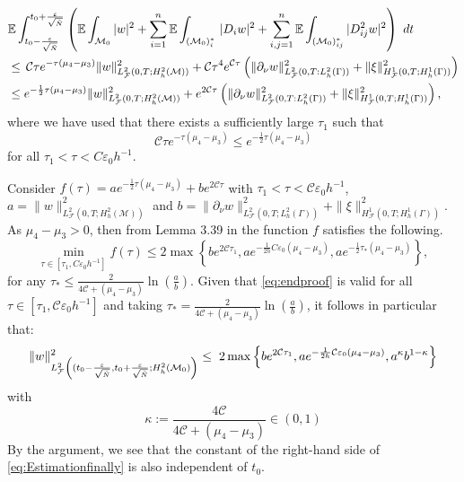 \documentclass[11pt,oneside,leqno]{amsart}
\numberwithin{equation}{section}
\numberwithin{equation}{section}
\newcommand{\E}{\mathbb{E}}
\begin{document}
\begin{equation}\label{eq:endproof}
\begin{split}
     &\E\int_{t_0-\frac{\varepsilon}{\sqrt{\Tilde{N}}}}^{t_0+\frac{\varepsilon}{\sqrt{\Tilde{N}}}}\left(\E\int_{\mathcal{M}_0}|w|^{2}+\sum_{i=1}^{n}\E\int_{(\mathcal{M}_{0})_{i}^{\ast}}\,|D_{i}w|^{2}+\sum_{i,j=1}^{n}\E\int_{(\mathcal{M}_0)^{\ast}_{ij}}|D^2_{ij} w|^2\right)\,\,dt\\
     &\leq\, \mathcal{C}\tau e^{-\tau (\mu_4-\mu_3)}\|w\|^2_{L_{\mathcal{F}}^2(0,T;H_h^2(\mathcal{M}))}+\mathcal{C}\tau^4 e^{\mathcal{C}\tau}\left(\|{ \partial_{\nu}w}\|^2_{L^2_\mathcal{F}(0,T:L_h^2(\Gamma))}+\|\xi\|^2_{H^1_{\mathcal{F}}(0,T;H_h^1(\Gamma))}\right)\\
     &\leq  e^{-\frac{1}{2}\tau (\mu_4-\mu_3)}\|w\|^2_{L_{\mathcal{F}}^2(0,T;H_h^2(\mathcal{M}))}+ e^{2\mathcal{C}\tau}\left(\|{ \partial_{\nu}w}\|^2_{L^2_\mathcal{F}(0,T:L_h^2(\Gamma))}+\|\xi\|^2_{H^1_{\mathcal{F}}(0,T;H_h^1(\Gamma))}\right),
\end{split}
\end{equation}
where we have used that there exists a sufficiently large $\tau_1$ such that
\begin{equation*}
    \mathcal{C}\tau e^{-\tau(\mu_4-\mu_3)}\leq e^{-\frac{1}{2}\tau(\mu_4-\mu_3)}
\end{equation*}
for all $\tau_1<\tau <C\varepsilon_0h^{-1}$. 

Consider $f(\tau)=ae^{-\frac{1}{2}\tau(\mu_4-\mu_3)}+be^{2\mathcal{C}\tau}$ with $\tau_1 <\tau<\mathcal{C}\varepsilon_0h^{-1}$, $a=\|w\|^2_{L^2_{\mathcal{F}}{(0,T;H_h^2(\mathcal{M}))}}$ and $b=\|{ \partial_{\nu}w}\|^2_{L^2_{\mathcal{F}}(0,T;L_h^2(\Gamma))}+\|\xi\|^2_{H^1_{\mathcal{F}}(0,T;H_h^1(\Gamma))}.$ As $\mu_4-\mu_3>0$, then from Lemma 3.39 in \cite{LOPD:2023} the function $f$ satisfies the following.
\[
\min_{\tau\in [\tau_1,C\varepsilon_0h^{-1}]}f(\tau)\leq 2\max\left\{be^{2\mathcal{C}\tau_1},ae^{-\frac{1}{2h}C\varepsilon_0(\mu_4-\mu_3)},ae^{-\frac{1}{2}\tau_{\ast}(\mu_4-\mu_3)}\right\},
\]
for any $\displaystyle \tau_{\ast}\leq \frac{2}{4\mathcal{C}+(\mu_4-\mu_3)}\ln{\left(\frac{a}{b}\right)} $. Given that \eqref{eq:endproof} is valid for all $\tau \in [\tau_1,\mathcal{C}\varepsilon_0h^{-1}]$ and taking $\tau_\ast=\frac{2}{4\mathcal{C}+(\mu_4-\mu_3)}\ln{\left(\frac{a}{b}\right)}$, it follows in particular that: 
\begin{equation}\label{eq:Estimationfinally}
\begin{split}
    \|w\|^2_{L^2_{\mathcal{F}}\left((t_0-\frac{\varepsilon}{\sqrt{\Tilde{N}}},t_0+\frac{\varepsilon}{\sqrt{\Tilde{N}}};H_h^2(\mathcal{M}_0)\right)}\leq\; 2\max\left\{be^{2\mathcal{C}\tau_1},ae^{-\frac{1}{2h}\mathcal{C}\varepsilon_0(\mu_4-\mu_3)},a^{\kappa}b^{1-\kappa}\right\}
\end{split}
\end{equation}
with
\begin{equation*}
    \kappa:=\frac{4\mathcal{C}}{4\mathcal{C}+(\mu_4-\mu_3)}\in (0,1)
\end{equation*}
By the argument, we see that the constant of the right-hand side of \eqref{eq:Estimationfinally} is also independent of $t_0$. 
\end{document}
